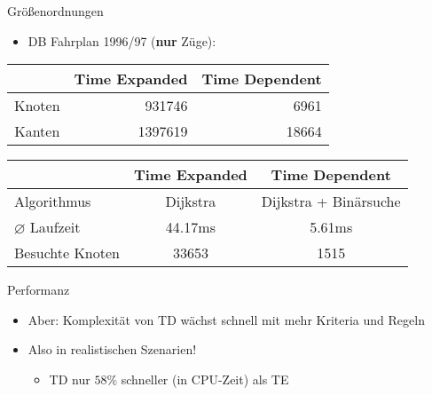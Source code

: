 \begin{frame}{Größenordnungen}
	\begin{itemize}
		\item DB Fahrplan 1996/97 (\textbf{nur} Züge):
	\end{itemize}
	
	\begin{center}
		\begin{tabular}{ c|r|r } 
			& Time Expanded & Time Dependent \\
 			\hline
 			\hline
 			Knoten & 931746 & 6961 \\
 			Kanten & 1397619 & 18664 \\
 			\hline
		\end{tabular}
	\end{center}
	
	\vspace{3em}	
	
	\begin{center}
		\begin{tabular}{ l|c|c } 
			& Time Expanded & Time Dependent \\
 			\hline
 			\hline
 			Algorithmus & Dijkstra & Dijkstra + Binärsuche \\
 			$\varnothing{}$ Laufzeit & 44.17ms & 5.61ms \\
 			Besuchte Knoten & 33653 & 1515 \\
 			\hline
		\end{tabular}
	\end{center}
\end{frame}


\begin{frame}{Performanz}
	\begin{itemize}
		\item Aber: Komplexität von TD wächst schnell mit mehr Kriteria und Regeln
		\item Also in realistischen Szenarien!
		\begin{itemize}
			\item TD nur $58\%$ schneller (in CPU-Zeit) als TE
		\end{itemize}
	\end{itemize}

\end{frame}

